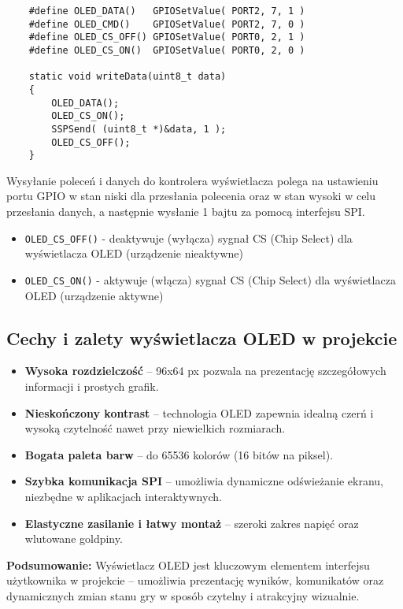 \documentclass[letterpaper,11pt]{report}
\begin{document}
  \begin{lstlisting}
    #define OLED_DATA()   GPIOSetValue( PORT2, 7, 1 )
    #define OLED_CMD()    GPIOSetValue( PORT2, 7, 0 )
    #define OLED_CS_OFF() GPIOSetValue( PORT0, 2, 1 )
    #define OLED_CS_ON()  GPIOSetValue( PORT0, 2, 0 )

    static void writeData(uint8_t data)
    {
        OLED_DATA();
        OLED_CS_ON();
        SSPSend( (uint8_t *)&data, 1 );
        OLED_CS_OFF();
    }
  \end{lstlisting}
  Wysyłanie poleceń i danych do kontrolera wyświetlacza polega na ustawieniu portu GPIO w stan niski dla przesłania polecenia oraz w stan wysoki w celu przesłania danych, a następnie wysłanie 1 bajtu za pomocą interfejsu SPI.
  \begin{itemize}
    \item \texttt{OLED\_CS\_OFF()} - deaktywuje (wyłącza) sygnał CS (Chip Select) dla wyświetlacza OLED (urządzenie nieaktywne)
    \item \texttt{OLED\_CS\_ON()} - aktywuje (włącza) sygnał CS (Chip Select) dla wyświetlacza OLED (urządzenie aktywne)
    
  \end{itemize}

\subsection{Cechy i zalety wyświetlacza OLED w projekcie}

\begin{itemize}
    \item \textbf{Wysoka rozdzielczość} – 96x64 px pozwala na prezentację szczegółowych informacji i prostych grafik.
    \item \textbf{Nieskończony kontrast} – technologia OLED zapewnia idealną czerń i wysoką czytelność nawet przy niewielkich rozmiarach.
    \item \textbf{Bogata paleta barw} – do 65536 kolorów (16 bitów na piksel).
    \item \textbf{Szybka komunikacja SPI} – umożliwia dynamiczne odświeżanie ekranu, niezbędne w aplikacjach interaktywnych.
    \item \textbf{Elastyczne zasilanie i łatwy montaż} – szeroki zakres napięć oraz wlutowane goldpiny.
\end{itemize}

\textbf{Podsumowanie:} Wyświetlacz OLED jest kluczowym elementem interfejsu użytkownika w projekcie – umożliwia prezentację wyników, komunikatów oraz dynamicznych zmian stanu gry w sposób czytelny i atrakcyjny wizualnie.
\end{document}
